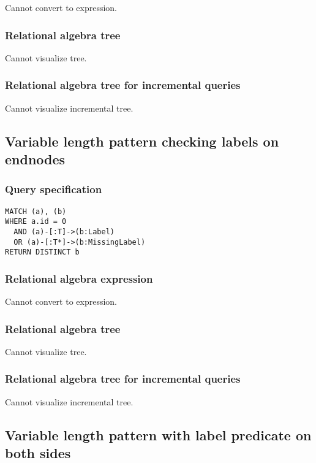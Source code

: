 Cannot convert to expression.

\subsubsection*{Relational algebra tree}

Cannot visualize tree.

\subsubsection*{Relational algebra tree for incremental queries}

Cannot visualize incremental tree.

\subsection{Variable length pattern checking labels on endnodes}

\subsubsection*{Query specification}

\begin{lstlisting}
MATCH (a), (b)
WHERE a.id = 0
  AND (a)-[:T]->(b:Label)
  OR (a)-[:T*]->(b:MissingLabel)
RETURN DISTINCT b
\end{lstlisting}

\subsubsection*{Relational algebra expression}

Cannot convert to expression.

\subsubsection*{Relational algebra tree}

Cannot visualize tree.

\subsubsection*{Relational algebra tree for incremental queries}

Cannot visualize incremental tree.

\subsection{Variable length pattern with label predicate on both sides}

